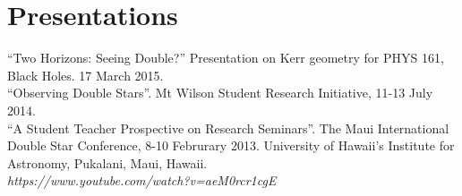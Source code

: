 \section{Presentations}

``Two Horizons: Seeing Double?'' Presentation on Kerr geometry for PHYS 161, Black Holes. 17 March 2015.\\
``Observing Double Stars''. Mt Wilson Student Research Initiative, 11-13 July 2014.\\
``A Student Teacher Prospective on Research Seminars''. The Maui International Double Star Conference, 8-10 Februrary 2013. University of Hawaii’s Institute for Astronomy, Pukalani, Maui, Hawaii.\\
{\sl https://www.youtube.com/watch?v=aeM0rcr1cgE }
